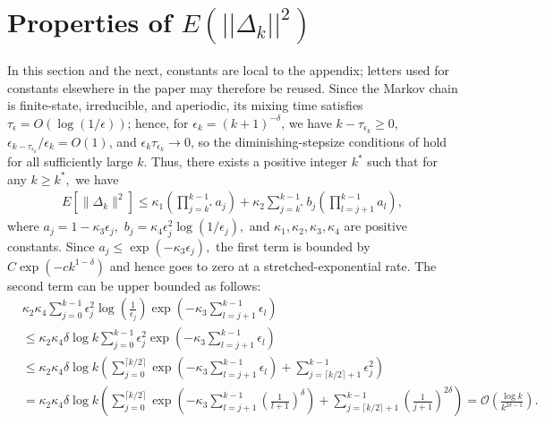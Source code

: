 \documentclass[11pt]{article}
\begin{document}



\appendix

\section{Properties of $E(||\Delta_k||^2)$}\label{sec: Delta}

In this section and the next, constants are local to the appendix; letters used for constants elsewhere in the paper may therefore be reused.
Since the Markov chain is finite-state, irreducible, and aperiodic, its mixing time satisfies $\tau_\epsilon=O(\log(1/\epsilon))$; hence, for $\epsilon_k=(k+1)^{-\delta}$, we have $k-\tau_{\epsilon_k}\geq 0$, $\epsilon_{k-\tau_{\epsilon_k}}/\epsilon_k=O(1)$, and $\epsilon_k\tau_{\epsilon_k}\to0$, so the diminishing-stepsize conditions of \cite[Theorem~12]{srikant2019finite} hold for all sufficiently large $k$. Thus, there exists a positive integer $k^*$ such that for any $k\geq k^*,$ we have
\begin{align*}
E\left[\|{\Delta}_{k}\|^2\right]\leq \kappa_1\left(\prod_{j=k^*}^{k-1} a_j\right) + \kappa_2\sum_{j=k^*}^{k-1}b_j\left(\prod_{l=j+1}^{k-1}a_l\right),
\end{align*}
where $a_j=1-{\kappa_3\epsilon_j},$ $b_j= \kappa_4\epsilon_j^2\log(1/\epsilon_j),$ and $\kappa_1,\kappa_2,\kappa_3,\kappa_4$ are positive constants. Since $a_j\leq \exp(-\kappa_3\epsilon_j),$ the first term is bounded by $C\exp(-c k^{1-\delta})$ and hence goes to zero at a stretched-exponential rate. The second term can be upper bounded as follows:
\begin{align*}
&\kappa_2\kappa_4\sum_{j=0}^{k-1}\epsilon_j^2\log\left(\frac{1}{\epsilon_j}\right)\exp\left(-\kappa_3\sum_{l=j+1}^{k-1}\epsilon_l\right)\\
&\leq \kappa_2\kappa_4\delta \log k\sum_{j=0}^{k-1}\epsilon_j^2\exp\left(-\kappa_3\sum_{l=j+1}^{k-1}\epsilon_l\right)\\
&\leq \kappa_2\kappa_4\delta \log k\left(\sum_{j=0}^{\lceil k/2\rceil}\exp\left(-\kappa_3\sum_{l=j+1}^{k-1}\epsilon_l\right)+\sum_{j=\lceil k/2\rceil+1}^{k-1}\epsilon_j^2\right)\\
&=\kappa_2\kappa_4\delta \log k\left(\sum_{j=0}^{\lceil k/2\rceil}\exp\left(-\kappa_3\sum_{l=j+1}^{k-1}(\frac{1}{l+1})^\delta\right)+\sum_{j=\lceil k/2\rceil+1}^{k-1}(\frac{1}{j+1})^{2\delta}\right)=\mathcal{O}\left(\frac{\log k}{k^{2\delta-1}}\right).
\end{align*}
\end{document}
